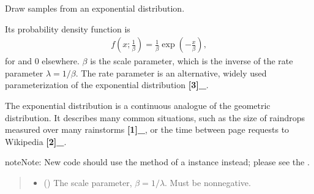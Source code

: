 \documentclass[letterpaper,10pt,english]{sphinxmanual}
\begin{document}
\begin{fulllineitems}
\label{\detokenize{metilda.controllers:metilda.controllers.pitch_art_wizard.exponential}}
\pysigstartsignatures
{}
\pysigstopsignatures
\sphinxAtStartPar
Draw samples from an exponential distribution.

\sphinxAtStartPar
Its probability density function is
\begin{equation*}
\begin{split}f(x; \frac{1}{\beta}) = \frac{1}{\beta} \exp(-\frac{x}{\beta}),\end{split}
\end{equation*}
\sphinxAtStartPar
for  and 0 elsewhere. \(\beta\) is the scale parameter,
which is the inverse of the rate parameter \(\lambda = 1/\beta\).
The rate parameter is an alternative, widely used parameterization
of the exponential distribution {\color{red}\bfseries{}{[}3{]}\_}.

\sphinxAtStartPar
The exponential distribution is a continuous analogue of the
geometric distribution.  It describes many common situations, such as
the size of raindrops measured over many rainstorms {\color{red}\bfseries{}{[}1{]}\_}, or the time
between page requests to Wikipedia {\color{red}\bfseries{}{[}2{]}\_}.

\begin{sphinxadmonition}{note}{Note:}
\sphinxAtStartPar
New code should use the 
method of a  instance instead;
please see the .
\end{sphinxadmonition}
\begin{quote}\begin{description}
\begin{itemize}
\item {} 
\sphinxAtStartPar
{} () \textendash{} The scale parameter, \(\beta = 1/\lambda\). Must be
non\sphinxhyphen{}negative.


\end{itemize}
\end{description}
\end{quote}
\end{fulllineitems}
\end{document}
